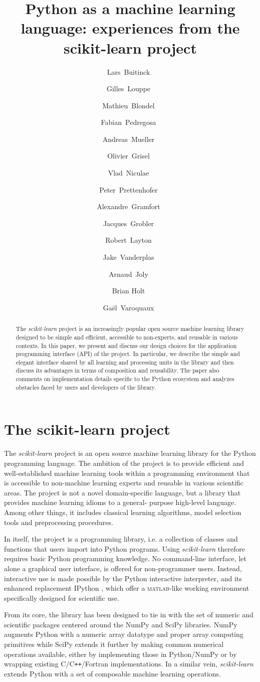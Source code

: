 \documentclass{llncs}
\title{Python as a machine learning language:
       experiences from the scikit-learn project}
\author{Lars~Buitinck~\inst{1,2} \and
        Gilles~Louppe~\inst{1,2} \and
        Mathieu~Blondel~\inst{1,2} \and
        Fabian~Pedregosa~\inst{2} \and
        Andreas~Mueller~\inst{2} \and
        Olivier~Grisel~\inst{2} \and
        Vlad~Niculae~\inst{2} \and
        Peter~Prettenhofer~\inst{2} \and
        Alexandre~Gramfort~\inst{2} \and
        Jacques~Grobler~\inst{2} \and
        Robert~Layton~\inst{2} \and
        Jake~Vanderplas~\inst{2} \and
        Arnaud~Joly~\inst{2} \and
        Brian Holt~\inst{2} \and
        Gaël~Varoquaux~\inst{2}}
\institute{Main authors of the present paper \and
           Core contributors to the project}
\newcommand{\sklearn}{\textit{scikit-learn}\xspace}
\begin{document}
\maketitle

\begin{abstract}
The \sklearn project is an increasingly popular open source machine
learning library designed to be simple and efficient, accessible to non-experts,
and reusable in various contexts. In this paper, we present and discuss our
design choices for the application programming interface (API) of the project.
In particular, we describe the simple and elegant interface shared by all
learning and processing units in the library and then discuss its advantages in
terms of composition and reusability. The paper also comments on implementation
details specific to the Python ecosystem and analyzes obstacles faced by users
and developers of the library.
\end{abstract}

\section{The scikit-learn project}

The \sklearn project \citep{pedregosa2011} is an open source machine learning
library for the Python programming language. The ambition of the project is to
provide efficient and well-established machine learning tools within a
programming environment that is accessible to non-machine learning experts and
reusable in various scientific areas. The project is not a novel domain-specific
language, but a library that provides machine learning idioms to a general-
purpose high-level language. Among other things, it includes classical learning
algorithms, model selection tools and preprocessing procedures.

In itself, the project is a programming library, i.e. a collection of classes
and functions that users import into Python programs. Using \sklearn therefore
requires basic Python programming knowledge. No command-line interface, let
alone a graphical user interface, is offered for non-programmer users. Instead,
interactive use is made possible by the Python interactive interpreter, and its
enhanced replacement IPython \citep{perez2007ipython}, which offer a
\textsc{matlab}-like working environment specifically designed for scientific
use.

From its core, the library has been designed to tie in with the set of numeric
and scientific packages centered around the NumPy and SciPy libraries. NumPy
\citep{vanderwalt2011} augments Python with a numeric array datatype and proper
array computing primitives while SciPy \citep{varoquaux2013scipy} extends it
further by making common numerical operations available, either by implementing
those in Python/NumPy or by wrapping existing C/C{}\verb!++!/Fortran
implementations. In a similar vein, \sklearn extends Python with a set of
composable machine learning operations.
\end{document}
